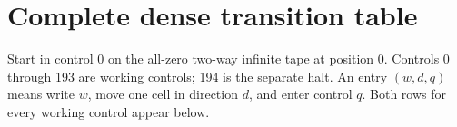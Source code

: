 \documentclass[11pt]{article}
\begin{document}
\clearpage
\section{Complete dense transition table}
\label{app:table}
Start in control 0 on the all-zero two-way infinite tape at position 0.
Controls 0 through 193 are working controls; 194 is the separate halt.
An entry $(w,d,q)$ means write $w$, move one cell in direction $d$, and
enter control $q$.  Both rows for every working control appear below.

\end{document}
